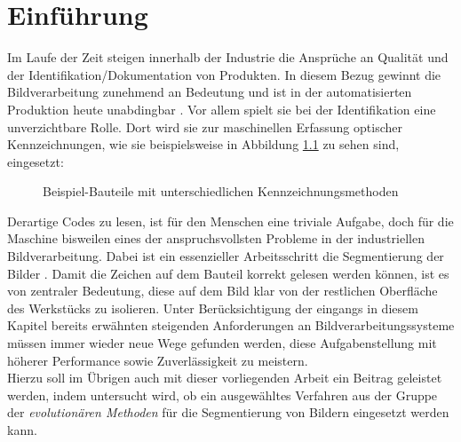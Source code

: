 \chapter{Einführung}
\label{sec:intro}
	
	Im Laufe der Zeit steigen innerhalb der Industrie die Ansprüche an Qualität und der Identifikation/Dokumentation von Produkten. In diesem Bezug gewinnt die Bildverarbeitung zunehmend an Bedeutung und ist in der automatisierten Produktion heute unabdingbar \cite[S. 1]{indust-imgproc}. 
	Vor allem spielt sie bei der Identifikation eine unverzichtbare Rolle. Dort wird sie zur maschinellen Erfassung optischer Kennzeichnungen, wie sie beispielsweise in Abbildung \ref{fig:example-code} zu sehen sind, eingesetzt:
	\begin{figure}[H]
		\centering
		\qquad
		\caption{Beispiel-Bauteile mit unterschiedlichen Kennzeichnungsmethoden}
		\label{fig:example-code}
	\end{figure}
	Derartige Codes zu lesen, ist für den Menschen eine triviale Aufgabe, doch für die Maschine bisweilen eines der anspruchsvollsten Probleme in der industriellen Bildverarbeitung. Dabei ist ein essenzieller Arbeitsschritt die Segmentierung der Bilder \cite[S. 136]{indust-imgproc}. Damit die Zeichen auf dem Bauteil korrekt gelesen werden können, ist es von zentraler Bedeutung, diese auf dem Bild klar von der restlichen Oberfläche des Werkstücks zu isolieren. Unter Berücksichtigung der eingangs in diesem Kapitel bereits erwähnten steigenden Anforderungen an Bildverarbeitungssysteme müssen immer wieder neue Wege gefunden werden, diese Aufgabenstellung mit höherer Performance sowie Zuverlässigkeit zu meistern.\\
	Hierzu soll im Übrigen auch mit dieser vorliegenden Arbeit ein Beitrag geleistet werden, indem untersucht wird, ob ein ausgewähltes Verfahren aus der Gruppe 
	der \textit{evolutionären Methoden} für die Segmentierung von Bildern eingesetzt werden kann. \\
	
